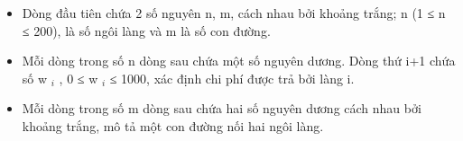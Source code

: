 \begin{itemize}
	\item     Dòng đầu tiên chứa 2 số nguyên n, m, cách nhau bởi khoảng trắng; n (1 ≤ n ≤ 200), là số ngôi làng và m là số con đường.   
	\item     Mỗi dòng trong số n dòng sau chứa một số nguyên dương. Dòng thứ i+1 chứa số w    $_     i    $    , 0  ≤  w    $_     i    $    ≤ 1000, xác định chi phí được trả bởi làng i.   
	\item     Mỗi dòng trong số m dòng sau chứa hai số nguyên dương cách nhau bởi khoảng trắng, mô tả một con đường nối hai ngôi làng.   
\end{itemize}